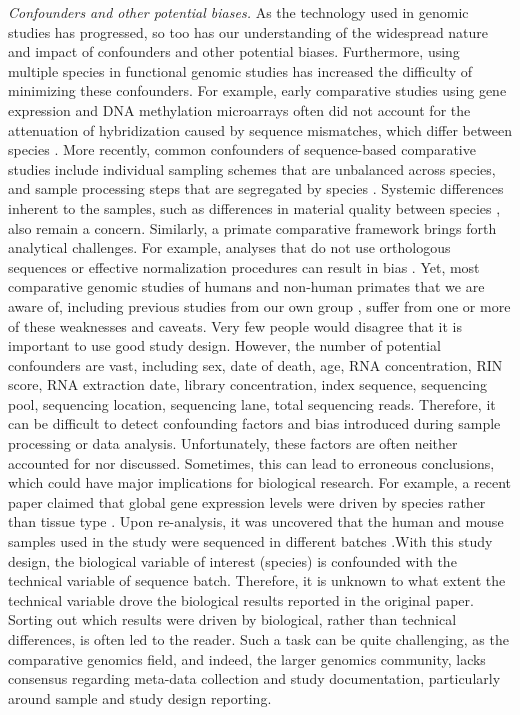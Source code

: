 \textit{Confounders and other potential biases.} As the technology used in genomic studies has progressed, so too has our understanding of the widespread nature and impact of confounders and other potential biases. Furthermore, using multiple species in functional genomic studies has increased the difficulty of minimizing these confounders. For example, early comparative studies using gene expression and DNA methylation microarrays often did not account for the attenuation of hybridization caused by sequence mismatches, which differ between species \cite{RN3419, RN1931, RN3430, RN3421}. More recently, common confounders of sequence-based comparative studies include individual sampling schemes that are unbalanced across species, and sample processing steps that are segregated by species \cite{RN1339, RN1, RN3285, RN3281, RN3432, RN3431}. Systemic differences inherent to the samples, such as differences in material quality between species \cite{RN1, RN3434}, also remain a concern. Similarly, a primate comparative framework brings forth analytical challenges. For example, analyses that do not use orthologous sequences or effective normalization procedures can result in bias \cite{RN1339, RN3285, RN3434}. Yet, most comparative genomic studies of humans and non-human primates that we are aware of, including previous studies from our own group \cite{RN1339, RN3285, RN3434}, suffer from one or more of these weaknesses and caveats. 
Very few people would disagree that it is important to use good study design. However, the number of potential confounders are vast, including sex, date of death, age, RNA concentration, RIN score, RNA extraction date, library concentration, index sequence, sequencing pool, sequencing location, sequencing lane, total sequencing reads. Therefore, it can be difficult to detect confounding factors and bias introduced during sample processing or data analysis. Unfortunately, these factors are often neither accounted for nor discussed. Sometimes, this can lead to erroneous conclusions, which could have major implications for biological research. For example, a recent paper claimed that global gene expression levels were driven by species rather than tissue type \cite{RN3432}. Upon re-analysis, it was uncovered that the human and mouse samples used in the study were sequenced in different batches \cite{RN1402}.With this study design, the biological variable of interest (species) is confounded with the technical variable of sequence batch. Therefore, it is unknown to what extent the technical variable drove the biological results reported in the original paper. 
Sorting out which results were driven by biological, rather than technical differences, is often led to the reader. Such a task can be quite challenging, as the comparative genomics field, and indeed, the larger genomics community, lacks consensus regarding meta-data collection and study documentation, particularly around sample and study design reporting. 

